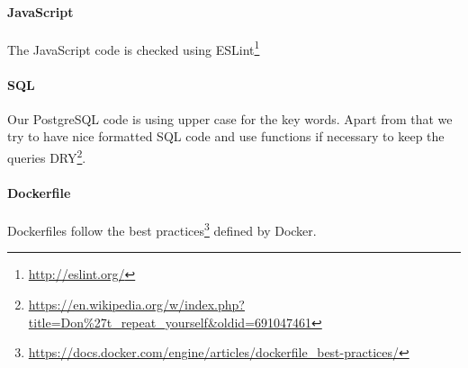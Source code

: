\paragraph{JavaScript} The JavaScript code is checked using ESLint\footnote{\url{http://eslint.org/}}

\paragraph{SQL} Our PostgreSQL code is using upper case for the key words. Apart from that we try to have nice formatted SQL code and use functions
if necessary to keep the queries DRY\footnote{\url{https://en.wikipedia.org/w/index.php?title=Don%27t_repeat_yourself&oldid=691047461}}.

\paragraph{Dockerfile} Dockerfiles follow the best practices\footnote{\url{https://docs.docker.com/engine/articles/dockerfile\_best-practices/}} defined by Docker.

